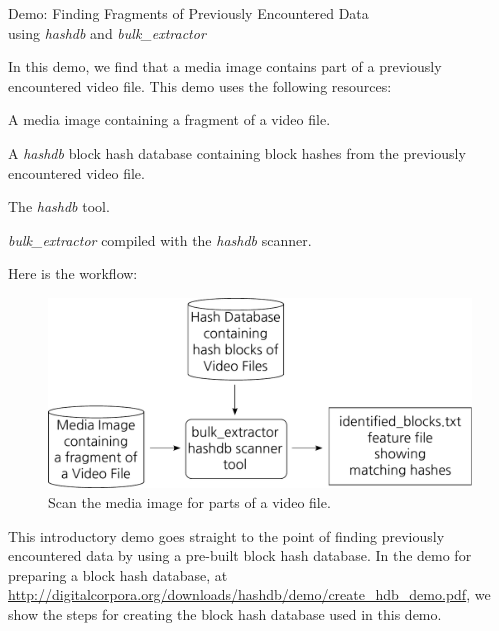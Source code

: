 \documentclass[12pt,twoside]{article}
\newcommand{\hdb}{\emph{hashdb}\xspace}
\newcommand{\bulk}{\emph{bulk\_extractor}\xspace}
\begin{document}
\begin{center}
\Large Demo: Finding Fragments of Previously Encountered Data \\
\large using \hdb and \bulk
\end{center}

In this demo, we find that a media image contains part of a
previously encountered video file.
This demo uses the following resources:
\begin{compactitem}
\item A media image containing a fragment of a video file.
\item A \hdb block hash database containing block hashes
from the previously encountered video file.
\item The \hdb tool.
\item \bulk compiled with the \hdb scanner.
\end{compactitem}

Here is the workflow:

\begin{figure}[H]
  \center
  \includegraphics[scale=0.6]{drawings/scan_hashdb}
  \caption*{Scan the media image for parts of a video file.}
  \label{fig:scan_hashdb}
\end{figure}

This introductory demo goes straight to the point of finding
previously encountered data by using a pre-built block hash database.
In the demo for preparing a block hash database, at
\url{http://digitalcorpora.org/downloads/hashdb/demo/create\_hdb\_demo.pdf},
we show the steps for creating the block hash database used in this demo.
\end{document}

